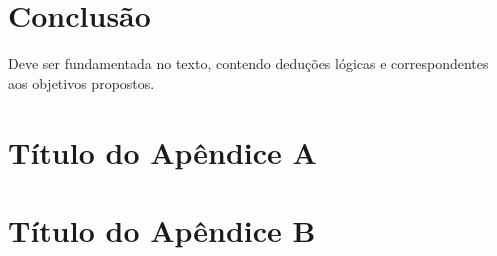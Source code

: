 \documentclass[
  12pt,		%
  a4paper,	%
  openright,%
  oneside,	%
  chapter=TITLE,		%
  section=TITLE,		%
  english,	%
  french,	%
  spanish,	%
  brazil	%
]{abntex2}
\begin{document}
    \chapter{Conclusão}
    
        Deve ser fundamentada no texto, contendo deduções lógicas e correspondentes aos objetivos propostos.
    
    
    \postextual
    
    
    
    
    
    \begin{apendicesenv}
        
        \chapter{Título do Apêndice A}
            \lipsum[50]
        
        \chapter{Título do Apêndice B}
            \lipsum[51]
        
    \end{apendicesenv}
    
\end{document}

